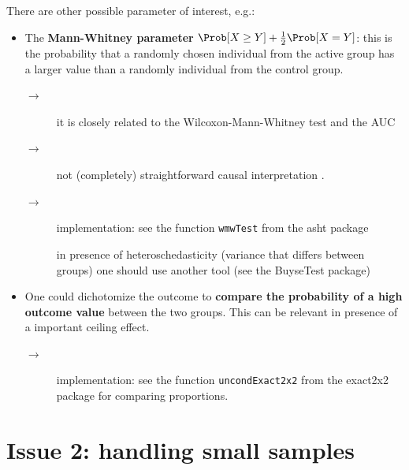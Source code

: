 \documentclass[12pt]{article}
\newcommand\Warning[1][3ex]{%
\renewcommand\stacktype{L}%
\scaleto{\stackon[1.3pt]{\color{red}$\triangle$}{\tiny\bfseries !}}{#1}%
\xspace
}
\begin{document}
\noindent There are other possible parameter of interest, e.g.:
\begin{itemize}
\item The \textbf{Mann-Whitney parameter} \(\Prob[X\geq Y] +
  \frac{1}{2}\Prob[X=Y]\): this is the probability that a randomly
chosen individual from the active group has a larger value than a
randomly individual from the control group. 
\begin{description}
\item[{\(\rightarrow\)}] it is closely related to the
Wilcoxon-Mann-Whitney test and the AUC
\item[{\(\rightarrow\)}] not (completely) straightforward causal
interpretation \citep{fay2018causal}.
\item[{\(\rightarrow\)}] implementation: see the function \texttt{wmwTest} from
the asht package \newline \Warning in presence of
heteroschedasticity (variance that differs between groups) one
should use another tool (see the BuyseTest package)
\end{description}

\item One could dichotomize the outcome to \textbf{compare the probability of a
high outcome value} between the two groups. This can be relevant in
presence of a important ceiling effect.
\begin{description}
\item[{\(\rightarrow\)}] implementation: see the function
\texttt{uncondExact2x2} from the exact2x2 package for comparing
proportions.
\end{description}
\end{itemize}

\clearpage

\section{Issue 2: handling small samples}
\label{sec:org2adbf1f}
\end{document}
